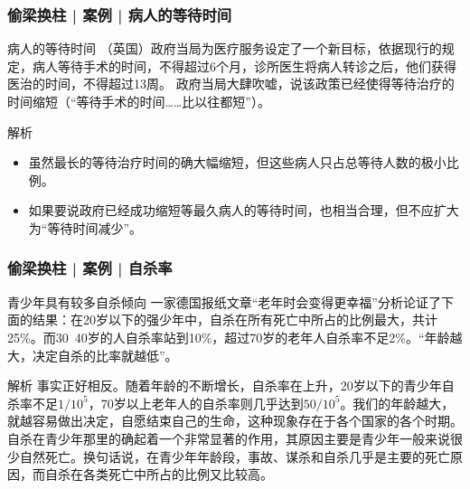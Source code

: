\begin{frame}
  \frametitle{偷梁换柱 | 案例 | 病人的等待时间}
  \begin{block}{病人的等待时间}
    （英国）政府当局为医疗服务设定了一个新目标，依据现行的规定，病人等待手术的时间，不得超过6个月，诊所医生将病人转诊之后，他们获得医治的时间，不得超过13周。
    政府当局大肆吹嘘，说该政策已经使得等待治疗的时间缩短（“等待手术的时间……比以往都短”）。
  \end{block}
  \pause
  \begin{block}{解析}
    \begin{itemize}
      \item 虽然最长的等待治疗时间的确大幅缩短，但这些病人只占总等待人数的极小比例。
      \item 如果要说政府已经成功缩短等最久病人的等待时间，也相当合理，但不应扩大为“等待时间减少”。
    \end{itemize}
  \end{block}
\end{frame}

\begin{frame}
  \frametitle{偷梁换柱 | 案例 | 自杀率}
  \begin{block}{青少年具有较多自杀倾向}
    一家德国报纸文章“老年时会变得更幸福”分析论证了下面的结果：在20岁以下的强少年中，自杀在所有死亡中所占的比例最大，共计25\%。而30~40岁的人自杀率站到10\%，超过70岁的老年人自杀率不足2\%。“年龄越大，决定自杀的比率就越低”。
  \end{block}
  \pause
  \begin{block}{解析}
    事实正好相反。随着年龄的不断增长，自杀率在上升，20岁以下的青少年自杀率不足$1/10^5$，70岁以上老年人的自杀率则几乎达到$50/10^5$。我们的年龄越大，就越容易做出决定，自愿结束自己的生命，这种现象存在于各个国家的各个时期。\\
    \vspace{0.3em}
自杀在青少年那里的确起着一个非常显著的作用，其原因主要是青少年一般来说很少自然死亡。换句话说，在青少年年龄段，事故、谋杀和自杀几乎是主要的死亡原因，而自杀在各类死亡中所占的比例又比较高。
  \end{block}
\end{frame}

